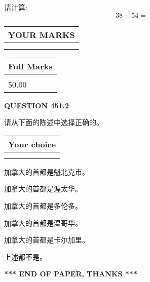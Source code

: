 \documentclass{ctexart}
\begin{document}
  
 
请计算:
\begin{equation}
38 +  %
54 = \nonumber
\end{equation}
 

 

 
  
\vspace{0.2in}
  
\noindent\begin{tabular}{|l|}
\hline
 YOUR MARKS  \\
\hline
 \\ 
 \\ 
\hline
\end{tabular}
\hspace{0.05in} \begin{tabular}{|l|}
\hline
 Full Marks  \\
\hline
 \\ 
50.00 \\
\hline
\end{tabular}
{\textbf{\Large{QUESTION
451.2 
}}}
  
  
请从下面的陈述中选择正确的。
  
  
\noindent\hspace{3.0in} \begin{tabular}{|l|}
\hline
Your choice \\
\hline
 \\ 
 \\ 
\hline
\end{tabular}
  
  
 
 
加拿大的首都是魁北克市。
 
 
加拿大的首都是渥太华。
 
 
加拿大的首都是多伦多。
 
 
加拿大的首都是温哥华。
 
 
加拿大的首都是卡尔加里。
 
 
 上述都不是。
 
 
   
   
 \vspace{0.2in}
 
   
   
   
   
\vspace{1.0in} 
{\textbf{\large{ *** END OF PAPER, THANKS *** }}} 
   
\end{document}
